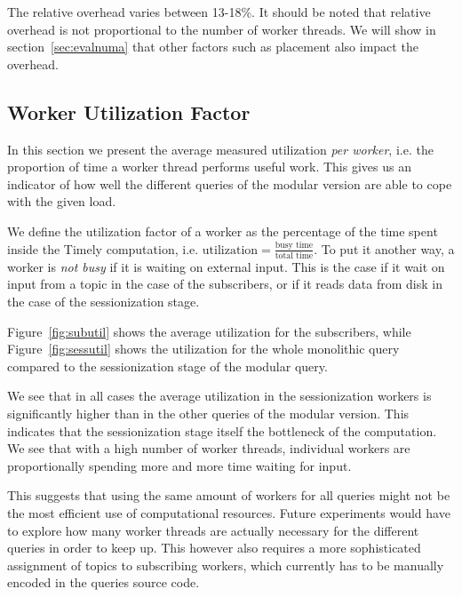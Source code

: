 The relative overhead varies between 13-18\%. It should be noted that relative
overhead is not proportional to the number of worker threads. We will show
in section~\ref{sec:evalnuma} that other factors such as placement also
impact the overhead.

\subsection{Worker Utilization Factor}


In this section we present the average measured utilization \emph{per worker},
i.e. the proportion of time a worker thread performs useful work.
This gives us an indicator of how well the different queries of the modular
version are able to cope with the given load.

We define the utilization factor of a worker as the percentage of
the time spent inside the Timely computation, i.e.
$\text{utilization} = \frac{\text{busy time}}{\text{total time}}$.
To put it another way, a worker is \emph{not busy} if it is waiting on external input.
This is the case if it wait on input from a topic in the case of the subscribers, 
or if it reads data from disk in the case of the sessionization stage.

Figure~\ref{fig:subutil} shows the average utilization for the subscribers, while
Figure~\ref{fig:sessutil} shows the utilization for the whole monolithic query
compared to the sessionization stage of the modular query. 

We see that in all cases the average utilization in the sessionization workers
is significantly higher than in the other queries of the modular version. This indicates
that the sessionization stage itself the bottleneck of the computation. 
We see that with a high number of worker threads, individual workers are proportionally
spending more and more time waiting for input.

This suggests that using the same amount of workers for all queries might
not be the most efficient use of computational resources. Future experiments would have to
explore how many worker threads are actually necessary for the different queries
in order to keep up. This however also requires a more sophisticated assignment of
topics to subscribing workers, which currently has to be manually encoded in
the queries source code.

